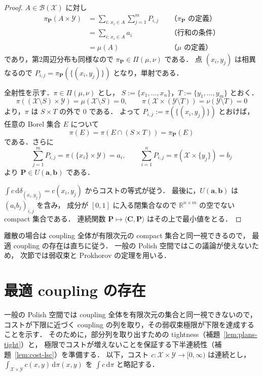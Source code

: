 \documentclass[12pt,a4j,twoside]{jreport}
\numberwithin{equation}{chapter}
\theoremstyle{definition} %
\newcommand{\R}{{\mathbb R}} %
\newcommand{\X}{\mathcal{X}}
\newcommand{\Y}{\mathcal{Y}}
\newcommand{\Borel}{\mathcal{B}}
\newcommand{\Couplings}{\Pi}
\newcommand{\inner}[2]{\langle #1,#2\rangle}
\renewcommand{\d}{\mathrm{d}} %
\begin{document}
\begin{proof}
  $A\in\Borel(\X)$ に対し
  \[
    \begin{aligned}
      \pi_{\mathbf{P}}(A\times\Y)
      &=\sum_{i:\,x_i\in A}\sum_{j=1}^mP_{i,j}
        &&\text{（$\pi_{\mathbf{P}}$ の定義）}\\
      &=\sum_{i:\,x_i\in A}a_i
        &&\text{（行和の条件）}\\
      &=\mu(A)
        &&\text{（$\mu$ の定義）}
    \end{aligned}
  \]
  であり，第2周辺分布も同様なので $\pi_{\mathbf{P}}\in\Couplings(\mu,\nu)$ である．
  点 $(x_i,y_j)$ は相異なるので $P_{i,j}=\pi_{\mathbf{P}}(\{(x_i,y_j)\})$ となり，単射である．

  全射性を示す．$\pi\in\Couplings(\mu,\nu)$ とし，
  $S:=\{x_1,\dots,x_n\}$，$T:=\{y_1,\dots,y_m\}$ とおく．
  \[
    \pi((\X\setminus S)\times\Y)=\mu(\X\setminus S)=0,\qquad
    \pi(\X\times(\Y\setminus T))=\nu(\Y\setminus T)=0
  \]
  より，$\pi$ は $S\times T$ の外で $0$ である．
  よって $P_{i,j}:=\pi(\{(x_i,y_j)\})$ とおけば，任意の Borel 集合 $E$ について
  \[
    \pi(E)=\pi(E\cap(S\times T))=\pi_{\mathbf{P}}(E)
  \]
  である．さらに
  \[
    \sum_{j=1}^mP_{i,j}=\pi(\{x_i\}\times\Y)=a_i,\qquad
    \sum_{i=1}^nP_{i,j}=\pi(\X\times\{y_j\})=b_j
  \]
  より $\mathbf{P}\in U(\mathbf{a},\mathbf{b})$ である．

  $\int c\,\d\delta_{(x_i,y_j)}=c(x_i,y_j)$ からコストの等式が従う．
  最後に，$U(\mathbf{a},\mathbf{b})$ は $(a_ib_j)_{i,j}$ を含み，
  成分が $[0,1]$ に入る閉集合なので $\R^{n\times m}$ の空でない compact 集合である．
  連続関数 $\mathbf{P}\mapsto\inner{\mathbf{C}}{\mathbf{P}}$ はその上で最小値をとる．
\end{proof}

離散の場合は coupling 全体が有限次元の compact 集合と同一視できるので，
最適 coupling の存在は直ちに従う．
一般の Polish 空間ではこの議論が使えないため，
次節では弱収束と Prokhorov の定理を用いる．

\section{最適 coupling の存在}

一般の Polish 空間では coupling 全体を有限次元の集合と同一視できないので，
コストが下限に近づく coupling の列を取り，その弱収束極限が下限を達成することを示す．
そのために，部分列を取り出すための tightness（補題~\ref{lem:plans-tight}）と，
極限でコストが増えないことを保証する下半連続性（補題~\ref{lem:cost-lsc}）を準備する．
以下，コスト $c\colon\X\times\Y\to[0,\infty)$ は連続とし，
$\int_{\X\times\Y}c(x,y)\,\d\pi(x,y)$ を $\int c\,\d\pi$ と略記する．
\end{document}
